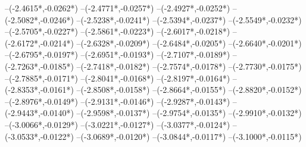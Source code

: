 {	--({-2.4615*\dx},{-0.0262*\dy})
	--({-2.4771*\dx},{-0.0257*\dy})
	--({-2.4927*\dx},{-0.0252*\dy})
	--({-2.5082*\dx},{-0.0246*\dy})
	--({-2.5238*\dx},{-0.0241*\dy})
	--({-2.5394*\dx},{-0.0237*\dy})
	--({-2.5549*\dx},{-0.0232*\dy})
	--({-2.5705*\dx},{-0.0227*\dy})
	--({-2.5861*\dx},{-0.0223*\dy})
	--({-2.6017*\dx},{-0.0218*\dy})
	--({-2.6172*\dx},{-0.0214*\dy})
	--({-2.6328*\dx},{-0.0209*\dy})
	--({-2.6484*\dx},{-0.0205*\dy})
	--({-2.6640*\dx},{-0.0201*\dy})
	--({-2.6795*\dx},{-0.0197*\dy})
	--({-2.6951*\dx},{-0.0193*\dy})
	--({-2.7107*\dx},{-0.0189*\dy})
	--({-2.7263*\dx},{-0.0185*\dy})
	--({-2.7418*\dx},{-0.0182*\dy})
	--({-2.7574*\dx},{-0.0178*\dy})
	--({-2.7730*\dx},{-0.0175*\dy})
	--({-2.7885*\dx},{-0.0171*\dy})
	--({-2.8041*\dx},{-0.0168*\dy})
	--({-2.8197*\dx},{-0.0164*\dy})
	--({-2.8353*\dx},{-0.0161*\dy})
	--({-2.8508*\dx},{-0.0158*\dy})
	--({-2.8664*\dx},{-0.0155*\dy})
	--({-2.8820*\dx},{-0.0152*\dy})
	--({-2.8976*\dx},{-0.0149*\dy})
	--({-2.9131*\dx},{-0.0146*\dy})
	--({-2.9287*\dx},{-0.0143*\dy})
	--({-2.9443*\dx},{-0.0140*\dy})
	--({-2.9598*\dx},{-0.0137*\dy})
	--({-2.9754*\dx},{-0.0135*\dy})
	--({-2.9910*\dx},{-0.0132*\dy})
	--({-3.0066*\dx},{-0.0129*\dy})
	--({-3.0221*\dx},{-0.0127*\dy})
	--({-3.0377*\dx},{-0.0124*\dy})
	--({-3.0533*\dx},{-0.0122*\dy})
	--({-3.0689*\dx},{-0.0120*\dy})
	--({-3.0844*\dx},{-0.0117*\dy})
	--({-3.1000*\dx},{-0.0115*\dy})
}
